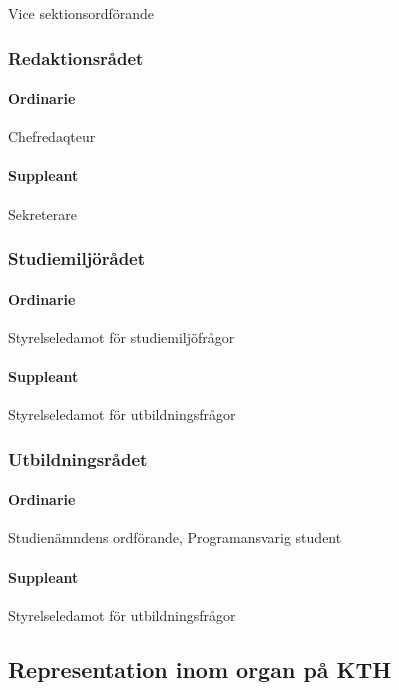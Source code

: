 \documentclass{dgovdoc}
\begin{document}
Vice sektionsordförande

\subsubsection{Redaktionsrådet}

\paragraph{Ordinarie}

Chefredaqteur

\paragraph{Suppleant}

Sekreterare

\subsubsection{Studiemiljörådet}

\paragraph{Ordinarie}

Styrelseledamot för studiemiljöfrågor

\paragraph{Suppleant}

Styrelseledamot för utbildningsfrågor

\subsubsection{Utbildningsrådet}

\paragraph{Ordinarie}

Studienämndens ordförande, Programansvarig student

\paragraph{Suppleant}

Styrelseledamot för utbildningsfrågor

\subsection{Representation inom organ på KTH}
\end{document}
